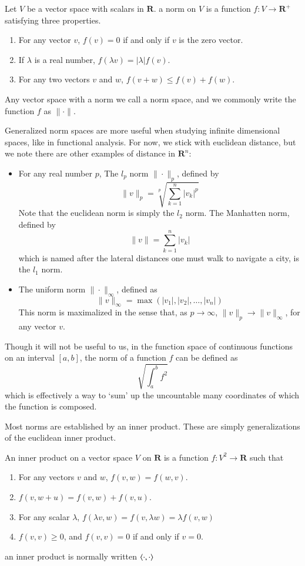 \begin{definition}
  Let $V$ be a vector space with scalars in $\mathbf{R}$. a norm on $V$ is a function $f:V \to \mathbf{R}^+$ satisfying three properties.
  \begin{enumerate}
    \item For any vector $v$, $f(v) = 0$ if and only if $v$ is the zero vector.
    \item If $\lambda$ is a real number, $f(\lambda v) = |\lambda|f(v)$.
    \item For any two vectors $v$ and $w$, $f(v + w) \leq f(v) + f(w)$.
  \end{enumerate}
  Any vector space with a norm we call a norm space, and we commonly write the function $f$ as $\| \cdot \|$.
\end{definition}

Generalized norm spaces are more useful when studying infinite dimensional spaces, like in functional analysis. For now, we stick with euclidean distance, but we note there are other examples of distance in $\mathbf{R}^n$:

\begin{itemize}
  \item For any real number $p$, The $l_p$ norm $\| \cdot \|_p$, defined by
  \[ \|v\|_p = \sqrt[p]{\sum_{k = 1}^n |v_k|^p} \]
  Note that the euclidean norm is simply the $l_2$ norm. The Manhatten norm, defined by
  \[ \|v\| = \sum_{k = 1}^n |v_k| \]
  which is named after the lateral distances one must walk to navigate a city, is the $l_1$ norm.
  \item The uniform norm $\| \cdot \|_\infty$, defined as
  \[ \| v \|_\infty = \max(|v_1|, |v_2|, \dots, |v_n|) \]
  This norm is maximalized in the sense that, as $p \to \infty$, $\|v\|_p \to \|v\|_\infty$, for any vector $v$.
\end{itemize}

Though it will not be useful to us, in the function space of continuous functions on an interval $[a,b]$, the norm of a function $f$ can be defined as
%
\[ \sqrt{\int_a^b f^2} \]
%
which is effectively a way to `sum' up the uncountable many coordinates of which the function is composed.

Most norms are established by an inner product. These are simply generalizations of the euclidean inner product.

\begin{definition}
  An inner product on a vector space $V$ on $\mathbf{R}$ is a function $f:V^2 \to \mathbf{R}$ such that
  \begin{enumerate}
    \item For any vectors $v$ and $w$, $f(v,w) = f(w,v)$.
    \item $f(v,w+u) = f(v,w) + f(v,u)$.
    \item For any scalar $\lambda$, $f(\lambda v,w) = f(v,\lambda w) = \lambda f(v,w)$
    \item $f(v,v) \geq 0$, and $f(v,v) = 0$ if and only if $v = 0$.
  \end{enumerate}
  an inner product is normally written $\langle\cdot, \cdot\rangle$
\end{definition}

